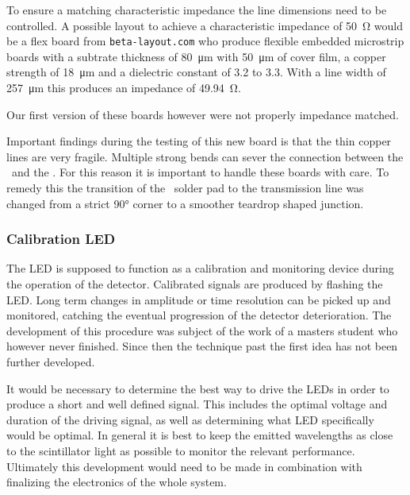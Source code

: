 \documentclass[../BTOF_summary.tex]{subfiles}
\begin{document}
To ensure a matching characteristic impedance the line dimensions need to be controlled.
A possible layout to achieve a characteristic impedance of \SI{50}{\ohm} would be a flex board from \texttt{beta-layout.com} who produce flexible embedded microstrip boards with a subtrate thickness of \SI{80}{\micro m} with \SI{50}{\micro m} of cover film, a copper strength of \SI{18}{\micro m} and a dielectric constant of 3.2 to 3.3.
With a line width of \SI{257}{\micro m} this produces an impedance of \SI{49.94}{\ohm}.

Our first version of these boards however were not properly impedance matched.

Important findings during the testing of this new board is that the thin copper lines are very fragile.
Multiple strong bends can sever the connection between the \sipms\ and the \railboard .
For this reason it is important to handle these boards with care.
To remedy this the transition of the \sipm\ solder pad to the transmission line was changed from a strict \ang{90} corner to a smoother teardrop shaped junction.

\subsubsection*{Calibration LED}
The LED is supposed to function as a calibration and monitoring device during the operation of the detector.
Calibrated signals are produced by flashing the LED.
Long term changes in amplitude or time resolution can be picked up and monitored, catching the eventual progression of the detector deterioration.
The development of this procedure was subject of the work of a masters student who however never finished.
Since then the technique past the first idea has not been further developed.

It would be necessary to determine the best way to drive the LEDs in order to produce a short and well defined signal. 
This includes the optimal voltage and duration of the driving signal, as well as determining what LED specifically would be optimal.
In general it is best to keep the emitted wavelengths as close to the scintillator light as possible to monitor the relevant performance.
Ultimately this development would need to be made in combination with finalizing the electronics of the whole system.
\end{document}
